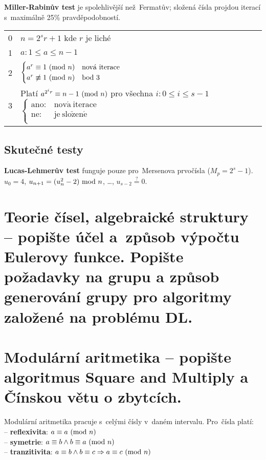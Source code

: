 \noindent \textbf{Miller-Rabinův test} je spolehlivější než~Fermatův; složená čísla projdou iterací s~maximálně 25\% pravděpodobností.

\begin{table}[ht]
\begin{tabular}{l|l}
0 & $n = 2^s r + 1$ kde $r$ je liché \\
1 & $a: 1 \leq a \leq n-1$ \\
2 & $\begin{cases}
a^r \equiv 1 \ (\mathrm{mod}\ n) & \mathrm{nov\acute{a}\ iterace} \\
a^r \not\equiv 1 \ (\mathrm{mod}\ n) & \mathrm{bod\ 3} \\
\end{cases}$ \\
3 & Platí $a^{2^i r} \equiv n-1 \ (\mathrm{mod}\ n)$ pro všechna $i: 0 \leq i \leq s-1$ $\begin{cases}
\mathrm{ano:} & \mathrm{nov\acute{a}\ iterace} \\
\mathrm{ne:} & \mathrm{je\ slo\check{z}en\acute{e}} \\
\end{cases}$ \\
\end{tabular}
\end{table}

\subsection{Skutečné testy}

\textbf{Lucas-Lehmerův test} funguje pouze pro~Mersenova prvočísla ($M_p = 2^s - 1$). \\
$u_0 = 4$, $u_{n+1} = (u_n^2 - 2) \ \mathrm{mod}\ n$, \dots, $u_{s-2} \stackrel{?}{=} 0$.

\clearpage
\section{Teorie čísel, algebraické struktury -- popište účel a~způsob výpočtu Eulerovy funkce. Popište požadavky na grupu a způsob generování grupy pro algoritmy založené na problému DL.}

\clearpage
\section{Modulární aritmetika -- popište algoritmus Square and Multiply a Čínskou větu o zbytcích.}

Modulární aritmetika pracuje s~celými čísly v~daném intervalu. Pro~čísla platí: \\
-- \textbf{reflexivita}: $a \equiv a \ (\mathrm{mod}\ n)$ \\
-- \textbf{symetrie}: $a \equiv b \wedge b \equiv a \ (\mathrm{mod}\ n)$ \\
-- \textbf{tranzitivita}: $a \equiv b \wedge b \equiv c \Rightarrow a \equiv c \ (\mathrm{mod}\ n)$

